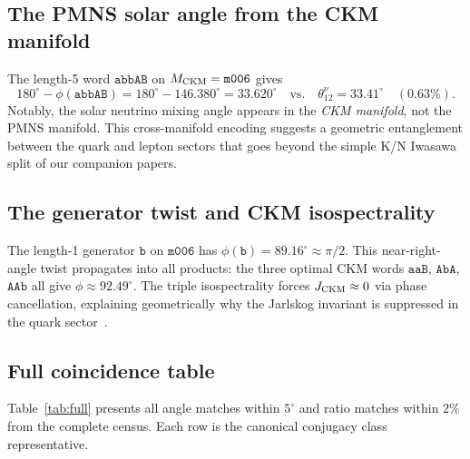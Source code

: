 \documentclass[preprint,12pt,number]{elsarticle}
\newcommand{\mfld}[1]{\texttt{#1}}
\newcommand{\word}[1]{\texttt{#1}}
\newcommand{\degr}{^{\circ}}
\begin{document}
\subsection{The PMNS solar angle from the CKM manifold}
\label{sec:theta12nu}

The length-5 word $\word{abbAB}$ on $M_{\rm CKM}=\mfld{m006}$ gives
\begin{equation}
  180\degr - \phi(\word{abbAB}) = 180\degr - 146.380\degr = 33.620\degr
  \quad\text{vs.}\quad \theta_{12}^\nu=33.41\degr \quad (0.63\%).
\end{equation}
Notably, the solar neutrino mixing angle appears in the \emph{CKM manifold},
not the PMNS manifold.
This cross-manifold encoding suggests a geometric entanglement between the
quark and lepton sectors that goes beyond the simple K/N Iwasawa split
of our companion papers.

\subsection{The generator twist and CKM isospectrality}
\label{sec:generator}

The length-1 generator $\word{b}$ on $\mfld{m006}$ has
$\phi(\word{b})=89.16\degr\approx\pi/2$.
This near-right-angle twist propagates into all products: the three optimal
CKM words $\word{aaB}$, $\word{AbA}$, $\word{AAb}$ all give
$\phi\approx 92.49\degr$.
The triple isospectrality forces $J_{\rm CKM}\approx 0$ via phase cancellation,
explaining geometrically why the Jarlskog invariant is suppressed in the
quark sector~\cite{GentryCKM}.

\subsection{Full coincidence table}
\label{sec:full_table}

Table~\ref{tab:full} presents all angle matches within $5\degr$ and ratio
matches within $2\%$ from the complete census.
Each row is the canonical conjugacy class representative.
\end{document}
